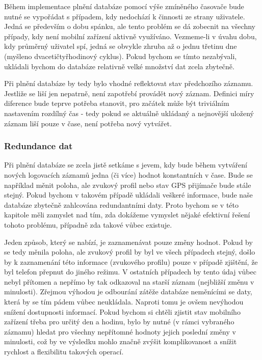 \documentclass[thesis=M,czech]{FITthesis}[2012/06/26]
\begin{document}
Během implementace plnění databáze pomocí výše zmíněného časovače bude nutné se vypořádat s případem, kdy nedochází k činnosti ze strany uživatele. Jedná se především o dobu spánku, ale tento problém se dá zobecnit na všechny případy, kdy není mobilní zařízení aktivně využíváno. Vezmeme-li v úvahu dobu, kdy průměrný uživatel spí, jedná se obvykle zhruba až o jednu třetinu dne (myšleno dvacetičtyřhodinový cyklus). Pokud bychom se tímto nezabývali, ukládali bychom do databáze relativně velké množství dat zcela zbytečně.

Při plnění databáze by tedy bylo vhodné reflektovat stav předchozího záznamu. Jestliže se liší jen nepatrně, není zapotřebí provádět nový záznam. Definici míry diference bude teprve potřeba stanovit, pro začátek může být triviálním nastavením rozdílný čas - tedy pokud se aktuálně ukládaný a nejnovější uložený záznam liší pouze v čase, není potřeba nový vytvářet.

\subsubsection*{Redundance dat}
Při plnění databáze se zcela jistě setkáme s jevem, kdy bude během vytváření nových logovacích záznamů jedna (či více) hodnot konstantních v čase. Bude se například měnit poloha, ale zvukový profil nebo stav GPS přijímače bude stále stejný. Pokud bychom v takovém případě ukládali veškeré informace, bude naše databáze zbytečně zahlcována redundantními daty. Proto bychom se v této kapitole měli zamyslet nad tím, zda dokážeme vymyslet nějaké efektivní řešení tohoto problému, případně zda takové vůbec existuje.

Jeden způsob, který se nabízí, je zaznamenávat pouze změny hodnot. Pokud by se tedy měnila poloha, ale zvukový profil by byl ve všech případech stejný, došlo by k zaznamenání této informace (zvukového profilu) pouze v případě zjištění, že byl telefon přepnut do jiného režimu. V ostatních případech by tento údaj vůbec nebyl přítomen a nepřímo by tak odkazoval na starší záznam (nejbližší změnu v minulosti). Zřejmou výhodou je odbourání zátěže databáze neměnícími se daty, která by se tím pádem vůbec neukládala. Naproti tomu je ovšem nevýhodou snížení dostupnosti informací. Pokud bychom si chtěli zjistit stav mobilního zařízení třeba pro určitý den a hodinu, bylo by nutné (v rámci vybraného záznamu) hledat pro všechny nepřítomné hodnoty jejich poslední změny v minulosti, což by ve výsledku mohlo značně zvýšit komplikovanost a snížit rychlost a flexibilitu takových operací.
\end{document}

